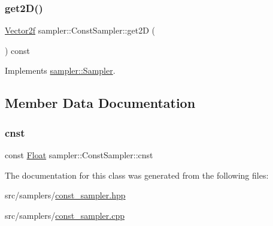 \subsubsection{\texorpdfstring{get2D()}{get2D()}}
{\footnotesize\ttfamily \mbox{\hyperlink{cyclop_8hpp_a0c5eff6545fe0b71d0592c88d930b697}{Vector2f}} sampler\+::\+Const\+Sampler\+::get2D (\begin{DoxyParamCaption}{ }\end{DoxyParamCaption}) const\hspace{0.3cm}{\ttfamily [virtual]}}



Implements \mbox{\hyperlink{classsampler_1_1Sampler_ad326337d2bac30ca6f95d01833d6e932}{sampler\+::\+Sampler}}.



\subsection{Member Data Documentation}
\mbox{\label{classsampler_1_1ConstSampler_a912148430feee4b02cd91c5565323a3c}} 
\subsubsection{\texorpdfstring{cnst}{cnst}}
{\footnotesize\ttfamily const \mbox{\hyperlink{cyclop_8hpp_a07afd7094cb489cbd514c76e6f55d34f}{Float}} sampler\+::\+Const\+Sampler\+::cnst}



The documentation for this class was generated from the following files\+:\begin{DoxyCompactItemize}
\item 
src/samplers/\mbox{\hyperlink{const__sampler_8hpp}{const\+\_\+sampler.\+hpp}}\item 
src/samplers/\mbox{\hyperlink{const__sampler_8cpp}{const\+\_\+sampler.\+cpp}}\end{DoxyCompactItemize}
